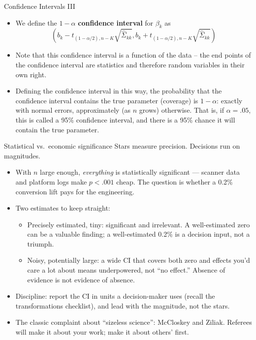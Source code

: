 \documentclass[aspectratio=169,11pt]{beamer}
\begin{document}
\begin{frame}{Confidence Intervals III}
\begin{itemize}
	\item We define the $1-\alpha$ {\bf confidence interval} for $\beta_{k}$ as \[
	\left(b_{k} - t_{\left(1-\alpha/2\right),n-K} \sqrt{\hat{\Sigma}_{kk}} , b_k +  t_{\left(1-\alpha/2\right),n-K}  \sqrt{\hat{\Sigma}_{kk}} \right)
	\]

	\smallskip
	\item Note that this confidence interval is a function of the data -- the end points of the confidence interval 
	are statistics and therefore random variables in their own right. 

	\smallskip
	\item Defining the confidence interval in this way, the probability that the confidence interval contains
	the true parameter (\alert{coverage}) is $1-\alpha$: exactly with normal errors, approximately
	(as $n$ grows) otherwise.
	That is, if $\alpha=.05$, this is called a 95\% confidence interval, and there
	is a 95\% chance it will contain the true parameter.

\end{itemize}
\end{frame}


\begin{frame}{Statistical vs.\ economic significance}
Stars measure \alert{precision}. Decisions run on \alert{magnitudes}.
\begin{itemize}
	\item With $n$ large enough, \emph{everything} is statistically significant ---
	scanner data and platform logs make $p < .001$ cheap. The question is whether a
	0.2\% conversion lift pays for the engineering.

	\medskip
	\item Two estimates to keep straight:
	\begin{itemize}
		\item \alert{Precisely estimated, tiny}: significant and irrelevant.
		A well-estimated zero can be a valuable finding; a well-estimated 0.2\% is a
		decision input, not a triumph.
		\item \alert{Noisy, potentially large}: a wide CI that covers both zero and
		effects you'd care a lot about means \alert{underpowered}, not ``no effect.''
		Absence of evidence is not evidence of absence.
	\end{itemize}

	\medskip
	\item Discipline: report the CI \alert{in units a decision-maker uses}
	(recall the transformations checklist), and lead with the magnitude, not the
	stars.

	\medskip
	\item The classic complaint about ``sizeless science'': McCloskey and Ziliak.
	Referees will make it about your work; make it about others' first.
\end{itemize}
\end{frame}
\end{document}

